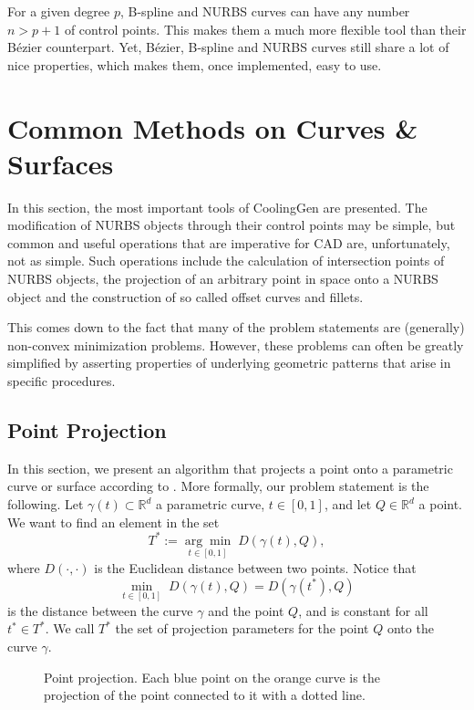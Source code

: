 \documentclass[a4paper, 11pt]{report}
\theoremstyle{definition}
\begin{document}
	For a given degree $p$, B-spline and NURBS curves can have any number $n > p+1$ of control points. This makes them a much more flexible tool than their Bézier counterpart. Yet, Bézier, B-spline and NURBS curves still share a lot of nice properties, which makes them, once implemented, easy to use.

\section{Common Methods on Curves \& Surfaces}
	In this section, the most important tools of CoolingGen are presented. The modification of NURBS objects through their control points may be simple, but common and useful operations that are imperative for CAD are, unfortunately, not as simple. Such operations include the calculation of intersection points of NURBS objects, the projection of an arbitrary point in space onto a NURBS object and the construction of so called offset curves and fillets.

	This comes down to the fact that many of the problem statements are (generally) non-convex minimization problems. However, these problems can often be greatly simplified by asserting properties of underlying geometric patterns that arise in specific procedures.

\subsection{Point Projection}\label{subsec:pointproj}
	In this section, we present an algorithm that projects a point onto a parametric curve or surface according to \cite{Piegl1997}. More formally, our problem statement is the following. Let $\gamma(t) \subset \mathbb{R}^d$ a parametric curve, $t \in [0,1]$, and let $Q \in \mathbb{R}^d$ a point. We want to find an element in the set
		$$T^* := \underset{t\in[0,1]}{\arg\min} \; D(\gamma(t), Q), $$
	where $D(\cdot, \cdot)$ is the Euclidean distance between two points. Notice that 
		$$\underset{t\in[0,1]}{\min} \; D(\gamma(t), Q) = D(\gamma(t^*), Q) $$
	is the distance between the curve $\gamma$ and the point $Q$, and is constant for all $t^* \in T^*$. We call $T^*$ the set of projection parameters for the point $Q$ onto the curve $\gamma$.

	\begin{figure}[H]
		\centering
		
		\caption{Point projection. Each blue point on the orange curve is the projection of the point connected to it with a dotted line.}
		\label{fig:pointinversion}
	\end{figure}
\end{document}
